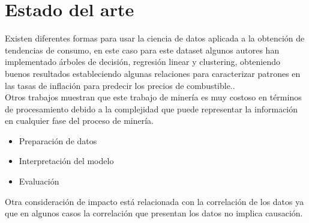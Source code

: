 \section{Estado del arte} 
 Existen diferentes formas para usar la ciencia de datos aplicada a la obtención de tendencias de consumo, en este caso para este dataset algunos autores han implementado árboles de decisión, regresión linear y clustering, obteniendo buenos resultados estableciendo algunas relaciones para caracterizar patrones en las tasas de inflación para predecir los precios de combustible..\\
 Otros trabajos muestran que este trabajo de minería es muy costoso en términos de procesamiento debido a la complejidad que puede representar la información en cualquier fase del proceso de minería.
 \begin{itemize}
  \item{Preparación de datos} 
  \item{Interpretación del modelo}
  \item{Evaluación}
 \end{itemize}
 Otra consideración de impacto está relacionada con la correlación de los datos ya que en algunos casos la correlación que presentan los datos no implica causación.
 
